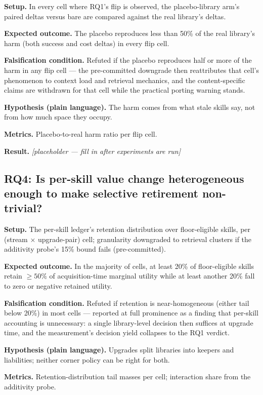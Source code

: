 \documentclass[11pt]{article}
\newcommand{\resultplaceholder}{\textit{[placeholder --- fill in after experiments are run]}}
\begin{document}
\textbf{Setup.} In every cell where RQ1's flip is observed, the placebo-library arm's paired deltas versus bare are compared against the real library's deltas.

\textbf{Expected outcome.} The placebo reproduces less than 50\% of the real library's harm (both success and cost deltas) in every flip cell.

\textbf{Falsification condition.} Refuted if the placebo reproduces half or more of the harm in any flip cell --- the pre-committed downgrade then reattributes that cell's phenomenon to context load and retrieval mechanics, and the content-specific claims are withdrawn for that cell while the practical porting warning stands.

\textbf{Hypothesis (plain language).} The harm comes from what stale skills say, not from how much space they occupy.

\textbf{Metrics.} Placebo-to-real harm ratio per flip cell.

\textbf{Result.} \resultplaceholder

\subsection{RQ4: Is per-skill value change heterogeneous enough to make selective retirement non-trivial?}

\textbf{Setup.} The per-skill ledger's retention distribution over floor-eligible skills, per (stream $\times$ upgrade-pair) cell; granularity downgraded to retrieval clusters if the additivity probe's 15\% bound fails (pre-committed).

\textbf{Expected outcome.} In the majority of cells, at least 20\% of floor-eligible skills retain $\geq 50\%$ of acquisition-time marginal utility while at least another 20\% fall to zero or negative retained utility.

\textbf{Falsification condition.} Refuted if retention is near-homogeneous (either tail below 20\%) in most cells --- reported at full prominence as a finding that per-skill accounting is unnecessary: a single library-level decision then suffices at upgrade time, and the measurement's decision yield collapses to the RQ1 verdict.

\textbf{Hypothesis (plain language).} Upgrades split libraries into keepers and liabilities; neither corner policy can be right for both.

\textbf{Metrics.} Retention-distribution tail masses per cell; interaction share from the additivity probe.
\end{document}
